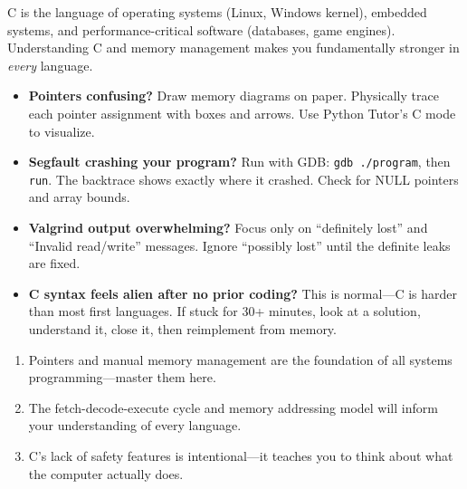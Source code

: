 \documentclass[11pt, a4paper, oneside]{report}
\begin{document}
\begin{realworldbox}
C is the language of operating systems (Linux, Windows kernel), embedded systems, and performance-critical software (databases, game engines). Understanding C and memory management makes you fundamentally stronger in \emph{every} language.
\end{realworldbox}


\begin{stuckbox}
\begin{itemize}[leftmargin=*]
\item \textbf{Pointers confusing?} Draw memory diagrams on paper. Physically trace each pointer assignment with boxes and arrows. Use Python Tutor's C mode to visualize.
\item \textbf{Segfault crashing your program?} Run with GDB: \texttt{gdb ./program}, then \texttt{run}. The backtrace shows exactly where it crashed. Check for NULL pointers and array bounds.
\item \textbf{Valgrind output overwhelming?} Focus only on ``definitely lost'' and ``Invalid read/write'' messages. Ignore ``possibly lost'' until the definite leaks are fixed.
\item \textbf{C syntax feels alien after no prior coding?} This is normal---C is harder than most first languages. If stuck for 30+ minutes, look at a solution, understand it, close it, then reimplement from memory.
\end{itemize}
\end{stuckbox}


\begin{takeawaybox}
\begin{enumerate}[leftmargin=*]
\item Pointers and manual memory management are the foundation of all systems programming---master them here.
\item The fetch-decode-execute cycle and memory addressing model will inform your understanding of every language.
\item C's lack of safety features is intentional---it teaches you to think about what the computer actually does.
\end{enumerate}
\end{takeawaybox}
\end{document}
